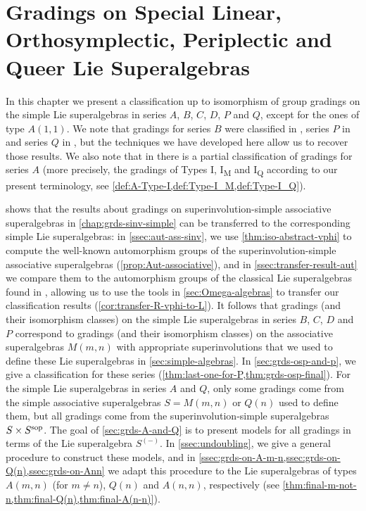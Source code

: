 \chapter{Gradings on Special Linear, Orthosymplectic, Periplectic and Queer Lie Superalgebras}\label{chap:Lie}


In this chapter we present a classification up to isomorphism of group gradings on the simple Lie superalgebras in series $A$, $B$, $C$, $D$, $P$ and $Q$, except for the ones of type $A(1,1)$. 
We note that gradings for series $B$ were classified in \cite{Helens_thesis}, series $P$ in \cite{paper-MAP} and series $Q$ in \cite{paper-Qn}, but the techniques we have developed here allow us to recover those results. 
We also note that in \cite{paper-MAP} there is a partial classification of gradings for series $A$ (more precisely, the gradings of Types I, I\textsubscript{M} and I\textsubscript{Q} according to our present terminology, see \cref{def:A-Type-I,def:Type-I_M,def:Type-I_Q}). 

 shows that the results about gradings on superinvolution-simple associative superalgebras in \cref{chap:grds-sinv-simple} can be transferred to the corresponding simple Lie superalgebras:
in \cref{ssec:aut-ass-sinv}, we use \cref{thm:iso-abstract-vphi} to compute the well-known automorphism groups of the superinvolution-simple associative superalgebras (\cref{prop:Aut-associative}), and in \cref{ssec:transfer-result-aut} we compare them to the automorphism groups of the classical Lie superalgebras found in \cite{serganova,Pianzola}, allowing us to use the tools in 
\cref{sec:Omega-algebras}
to transfer our classification results (\cref{cor:transfer-R-vphi-to-L}). 
It follows that gradings (and their isomorphism classes) on the simple Lie superalgebras in series $B$, $C$, $D$ and $P$ correspond to gradings (and their isomorphism classes) on the associative superalgebras $M(m,n)$ with appropriate superinvolutions that we used to define these Lie superalgebras in \cref{sec:simple-algebras}. 
In \cref{sec:grds-osp-and-p}, we give a classification for these series (\cref{thm:last-one-for-P,thm:grds-osp-final}). 
For the simple Lie superalgebras in series $A$ and $Q$, only some gradings come from the simple associative superalgebras $S = M(m,n)$ or $Q(n)$ used to define them, but all gradings come from the superinvolution-simple superalgebras $S \times S^{\mathrm{sop}}$. 
The goal of \cref{sec:grds-A-and-Q} is to present models for all gradings in terms of the Lie superalgebra $S^{(-)}$. 
In \cref{ssec:undoubling}, we give a general procedure to construct these models, and in \cref{ssec:grds-on-A-m-n,ssec:grds-on-Q(n),ssec:grds-on-Ann} we adapt this procedure to the Lie superalgebras of types $A(m,n)$ (for $m\neq n$), $Q(n)$ and $A(n,n)$, respectively (see \cref{thm:final-m-not-n,thm:final-Q(n),thm:final-A(n-n)}). 

